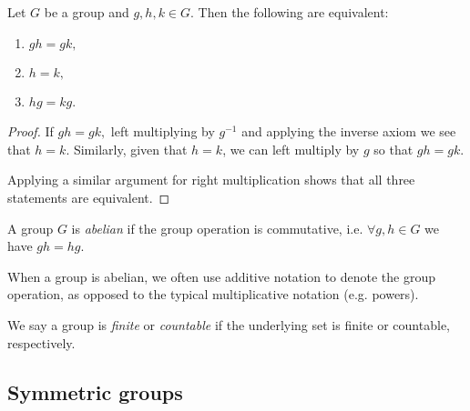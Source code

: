 \begin{proposition}
    Let $G$ be a group and $g,h,k \in G$. Then the following are equivalent:
    \begin{enumerate}
        \item $gh = gk,$
        \item $h=k,$
        \item $hg=kg$.
    \end{enumerate}
\end{proposition}

\begin{proof}
    If $gh = gk,$ left multiplying by $g^{-1}$ and applying the inverse axiom we see that $h = k$. Similarly, given that $h=k$, we can left multiply by $g$ so that $gh = gk.$

    Applying a similar argument for right multiplication shows that all three statements are equivalent.
\end{proof}


\begin{definition}
  A group $G$ is \emph{abelian} if the group operation is commutative, i.e. $\forall g,h\in G$ we have
  $gh=hg$.
  \label{abelianGroup}
\end{definition}
When a group is abelian, we often use additive notation to denote the group operation, as opposed to the typical multiplicative notation (e.g. powers).


\begin{definition}
  We say a group is \emph{finite} or \emph{countable} if the underlying set is finite or countable,
  respectively.
\end{definition}


\subsection{Symmetric groups}

